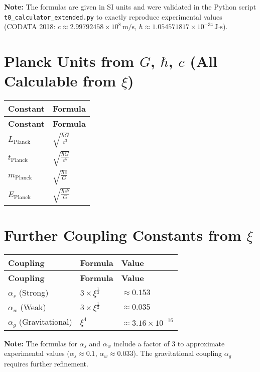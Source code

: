 \documentclass[12pt,a4paper]{article}
\begin{document}
	\textbf{Note:} The formulas are given in SI units and were validated in the Python script \texttt{t0\_calculator\_extended.py} to exactly reproduce experimental values (CODATA 2018: $c \approx 2.99792458 \times 10^8 \, \text{m/s}$, $\hbar \approx 1.054571817 \times 10^{-34} \, \text{J·s}$).
	
	\section{Planck Units from $G$, $\hbar$, $c$ (All Calculable from $\xi$)}
	\begin{longtable}{|p{5cm}|p{6cm}|}
		\hline
		\textbf{Constant} & \textbf{Formula} \\
		\hline
		\endfirsthead
		\hline
		\textbf{Constant} & \textbf{Formula} \\
		\hline
		\endhead
		$L_{\text{Planck}}$ & $\sqrt{\frac{\hbar G}{c^{3}}}$ \\
		\hline
		$t_{\text{Planck}}$ & $\sqrt{\frac{\hbar G}{c^{5}}}$ \\
		\hline
		$m_{\text{Planck}}$ & $\sqrt{\frac{\hbar c}{G}}$ \\
		\hline
		$E_{\text{Planck}}$ & $\sqrt{\frac{\hbar c^{5}}{G}}$ \\
		\hline
	\end{longtable}
	
	\section{Further Coupling Constants from $\xi$}
	\begin{longtable}{|p{4cm}|p{4cm}|p{4cm}|}
		\hline
		\textbf{Coupling} & \textbf{Formula} & \textbf{Value} \\
		\hline
		\endfirsthead
		\hline
		\textbf{Coupling} & \textbf{Formula} & \textbf{Value} \\
		\hline
		\endhead
		$\alpha_s$ (Strong) & $3 \times \xi^{\frac{1}{3}}$ & $\approx 0.153$ \\
		\hline
		$\alpha_w$ (Weak) & $3 \times \xi^{\frac{1}{2}}$ & $\approx 0.035$ \\
		\hline
		$\alpha_g$ (Gravitational) & $\xi^4$ & $\approx 3.16 \times 10^{-16}$ \\
		\hline
	\end{longtable}
	
	\textbf{Note:} The formulas for $\alpha_s$ and $\alpha_w$ include a factor of 3 to approximate experimental values ($\alpha_s \approx 0.1$, $\alpha_w \approx 0.033$). The gravitational coupling $\alpha_g$ requires further refinement.
	
\end{document}
